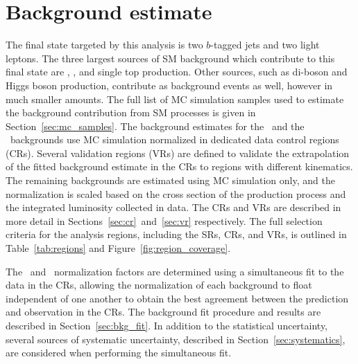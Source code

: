\FloatBarrier
\section{Background estimate}
\label{sec:bkg}

The final state targeted by this analysis is two $b$-tagged jets and two light
leptons.
The three largest sources of SM background which contribute to this final state
are \TTBAR, \ZGAMMAJETS, and single top production.
Other sources, such as di-boson and Higgs boson production, contribute as
background events as well, however in much smaller amounts.
The full list of MC simulation samples used to estimate the background
contribution from SM processes is given in Section~\ref{sec:mc_samples}.
The background estimates for the \TTBAR\ and the \ZGAMMAJETS\ backgrounds use
MC simulation normalized in dedicated data control regions (CRs).
Several validation regions (VRs) are defined to validate the extrapolation of
the fitted background estimate in the CRs to regions with different kinematics.
The remaining backgrounds are estimated using MC simulation only, and the
normalization is scaled based on the cross section of the production process and
the integrated luminosity collected in data.
The CRs and VRs are described in more detail in
Sections~\ref{sec:cr}~and~\ref{sec:vr} respectively.
The full selection criteria for the analysis regions, including the SRs, CRs,
and VRs, is outlined in Table~\ref{tab:regions} and
Figure~\ref{fig:region_coverage}.

The \TTBAR\ and \ZGAMMAJETS\ normalization factors are determined using a
simultaneous fit to the data in the CRs, allowing the normalization of each
background to float independent of one another to obtain the best agreement
between the prediction and observation in the CRs.
The background fit procedure and results are described in
Section~\ref{sec:bkg_fit}.
In addition to the statistical uncertainty, several sources of systematic
uncertainty, described in Section~\ref{sec:systematics}, are considered when
performing the simultaneous fit.


